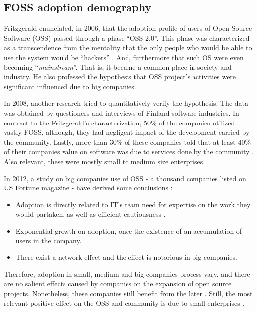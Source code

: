 \documentclass[
12pt,				%
openright,			%
oneside,			%
a4paper,			%
brazil,				%
english,			  %
]{abntex2}
\begin{document}
\subsection{FOSS adoption demography}

Fritzgerald enunciated, in 2006, that the adoption profile of users of
Open Source Software (OSS) passed through a phase ``OSS 2.0''. This
phase was characterized as a transcendence from the mentality that the
only people who would be able to use the system would be ``hackers''
\cite{fitzgerald2006transformation}. And, furthermore that such OS
were even becoming ``\textit{mainstream}''. That is, it became a common
place in society and industry. He also professed the hypothesis that
OSS project's activities were significant influenced due to big companies. 

In 2008, another research tried to quantitatively verify the
hypothesis. The data was obtained by questioners and interviews of
Finland software industries. In contrast to the Fritzgerald's
characterization, 50\% of the companies utilized vastly FOSS,
although, they had negligent impact of the development carried by the
community. Lastly, more than 30\% of these companies told that at
least 40\% of their companies value on software was due to services
done by the community \cite{hauge2008adoption}. Also relevant, these
were mostly small to medium size enterprises.    

In 2012, a study on big companies use of OSS - a thousand companies listed on US
Fortune magazine - have derived some conclusions \cite{spinellis2012organizational}: 
\begin{itemize}
\item Adoption is directly related to IT's team need for expertise on
  the work they would partaken, as well as efficient cautiousness \cite{gallego2015open,
 li2013all}.
\item Exponential growth on adoption, once the existence of an
  accumulation of users in the company. 
\item There exist a network effect and the effect is notorious in big companies.  
\end{itemize}

Therefore, adoption in small, medium and big companies process vary,
and there are no salient effects caused by companies on the expansion
of open source projects. Nonetheless, these companies still benefit
from the later \cite{spinellis2012organizational,hauge2008adoption,
  fitzgerald2006transformation}. Still, the most relevant positive-effect on
the OSS and community is due to small enterprises \cite{kshetri2004economics}.  
\end{document}
